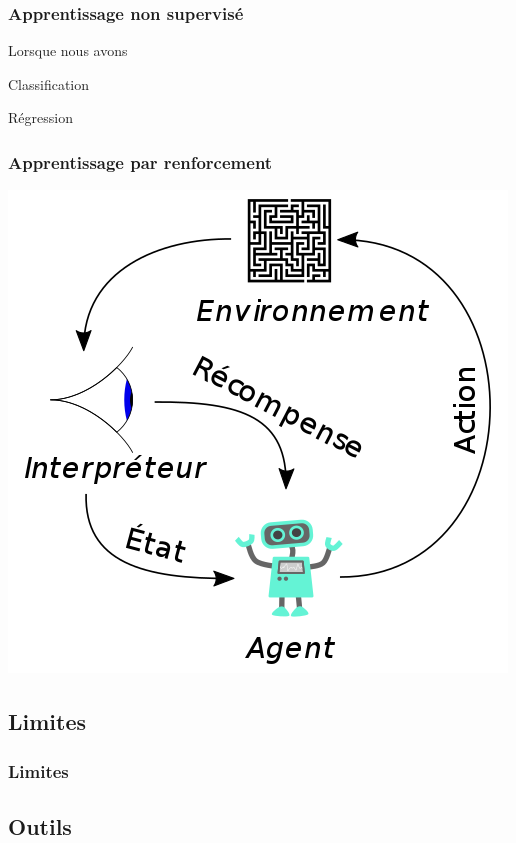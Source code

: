 \documentclass[]{beamer} %
\begin{document}

\begin{frame}
\frametitle{Apprentissage non supervisé}

Lorsque nous avons 

Classification 

Régression 

\end{frame}


\begin{frame}
\frametitle{Apprentissage par renforcement} 

\includegraphics[height=\textheight]{../IMG/RL-fr.png}

\end{frame}


\subsection{Limites}

\begin{frame}
\frametitle{Limites}

\end{frame}


\subsection{Outils}
\end{document}
